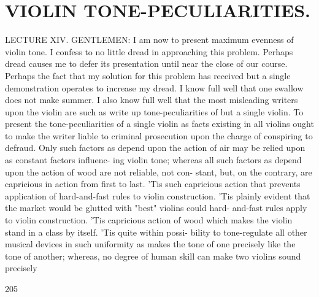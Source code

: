 \documentclass{article}
\begin{document}
\section*{VIOLIN TONE-PECULIARITIES.}
LECTURE XIV. GENTLEMEN: I am now to present maximum evenness of violin tone. I confess to no little dread in approaching this problem. Perhaps dread causes me to defer its presentation until near the close of our course. Perhaps the fact that my solution for this problem has received but a single demonstration operates to increase my dread. I know full well that one swallow does not make summer. I also know full well that the most misleading writers upon the violin are such as write up tone-peculiarities of but a single violin. To present the tone-peculiarities of a single violin as facts existing in all violins ought to make the writer liable to criminal prosecution upon the charge of conspiring to defraud. Only such factors as depend upon the action of air may be relied upon as constant factors influenc- ing violin tone; whereas all such factors as depend upon the action of wood are not reliable, not con- stant, but, on the contrary, are capricious in action from first to last. 'Tis such capricious action that prevents application of hard-and-fast rules to violin construction. 'Tis plainly evident that the market would be glutted with "best" violins could hard- and-fast rules apply to violin construction. 'Tis capricious action of wood which makes the violin stand in a class by itself. 'Tis quite within possi- bility to tone-regulate all other musical devices in such uniformity as makes the tone of one precisely like the tone of another; whereas, no degree of human skill can make two violins sound precisely

205
\end{document}
